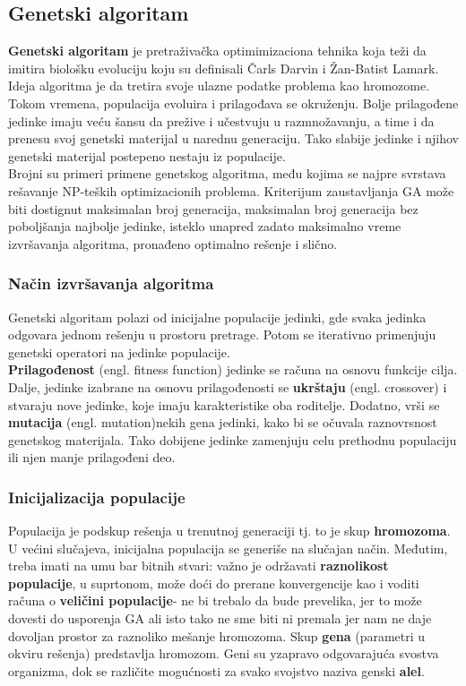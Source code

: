 \documentclass[a4paper]{article}
\begin{document}
\subsection{Genetski algoritam}
\textbf{Genetski algoritam} je pretraživačka optimimizaciona tehnika koja teži da imitira biološku evoluciju koju su definisali Čarls Darvin i Žan-Batist Lamark. Ideja algoritma je da tretira svoje ulazne podatke problema kao hromozome.\\ Tokom vremena, populacija evoluira i prilagođava se okruženju. Bolje prilagođene jedinke imaju veću šansu da prežive i učestvuju u razmnožavanju, a time i da prenesu svoj genetski materijal u narednu generaciju. Tako slabije jedinke i njihov genetski materijal postepeno nestaju iz populacije.\\ Brojni su primeri primene genetskog algoritma, među kojima se najpre svrstava rešavanje NP-teških optimizacionih problema. Kriterijum zaustavljanja GA može biti dostignut maksimalan broj generacija, maksimalan broj generacija bez poboljšanja najbolje jedinke, isteklo unapred zadato maksimalno vreme izvršavanja algoritma, pronađeno optimalno rešenje i slično.


\subsubsection{Način izvršavanja algoritma}

Genetski algoritam polazi od inicijalne populacije jedinki, gde svaka jedinka odgovara jednom rešenju u prostoru pretrage. Potom se iterativno primenjuju genetski operatori na jedinke populacije.\\
\textbf{Prilagođenost} (engl. fitness function) jedinke se računa na osnovu funkcije cilja. Dalje, jedinke izabrane na osnovu prilagođenosti se \textbf{ukrštaju} (engl. crossover) i stvaraju nove jedinke, koje imaju karakteristike oba roditelje. Dodatno, vrši se \textbf{mutacija} (engl. mutation)nekih gena jedinki, kako bi se očuvala raznovrsnost genetskog materijala. Tako dobijene jedinke zamenjuju celu prethodnu populaciju
ili njen manje prilagođeni deo.

\subsubsection{Inicijalizacija populacije}
Populacija je podskup rešenja u  trenutnoj generaciji tj. to je skup \textbf{hromozoma}. U većini slučajeva, inicijalna populacija se generiše na slučajan način. Međutim, treba imati na umu bar bitnih stvari: važno je održavati \textbf{raznolikost populacije}, u suprtonom, može doći do prerane konvergencije kao i voditi računa o \textbf{veličini populacije}- ne bi trebalo da bude prevelika, jer to može dovesti do usporenja GA ali isto tako ne sme biti ni premala jer nam ne daje dovoljan prostor za raznoliko mešanje hromozoma. Skup \textbf{gena} (parametri u okviru rešenja) predstavlja hromozom. Geni su yzapravo odgovarajuća svostva organizma, dok se različite mogućnosti za svako svojstvo naziva genski \textbf{alel}.
\end{document}
